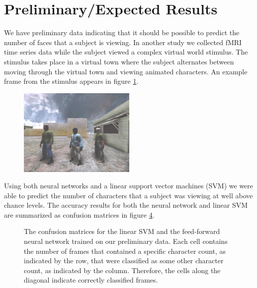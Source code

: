 \documentclass[12pt]{article}
\begin{document}
\section{Preliminary/Expected Results}
We have preliminary data indicating that it should be possible to predict the number of faces that a subject is viewing.
In another study we collected fMRI time series data while the subject viewed a complex virtual world stimulus.
The stimulus takes place in a virtual town where the subject alternates between moving through the virtual town and viewing animated characters.
An example frame from the stimulus appears in figure \ref{fig:preliminary-data-frame}.
\begin{figure}
\centering
\includegraphics[width=0.5\textwidth]{figures/preliminary-data-frame}
\label{fig:preliminary-data-frame}
\end{figure}
Using both neural networks and a linear support vector machines (SVM) we were able to predict the number of characters that a subject was viewing at well above chance levels.
The accuracy results for both the neural network and linear SVM are summarized as confusion matrices in figure \ref{fig:preliminary-data-confusion}.
\begin{figure}
\centering
\begin{subfigure}{\textwidth}
\centering

\caption{}
\label{fig:svm-confusion}
\end{subfigure}
\begin{subfigure}{\textwidth}
\centering

\caption{}
\label{fig:nn-confusion}
\end{subfigure}
\caption{The confusion matrices for the  linear SVM and the  feed-forward neural network trained on our preliminary data.
Each cell contains the number of frames that contained a specific character count, as indicated by the row, that were classified as some other character count, as indicated by the column.
Therefore, the cells along the diagonal indicate correctly classified frames.}
\label{fig:preliminary-data-confusion}
\end{figure}
\end{document}
